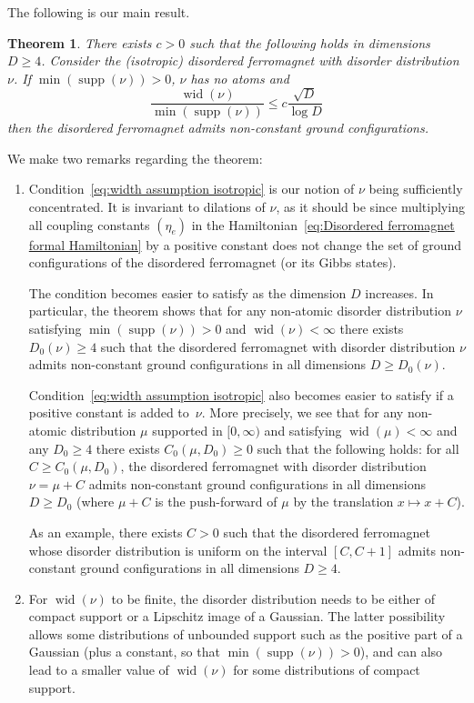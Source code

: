 \documentclass[11pt, reqno]{amsart}
\newtheorem{theorem}{Theorem}[section]
\DeclareMathOperator{\supp}{supp}
\DeclareMathOperator{\wid}{wid}
\numberwithin{equation}{section}
\begin{document}
The following is our main result.
\begin{theorem}\label{thm:non-constant ground configuration}
There exists $c>0$ such that the following holds in dimensions $D\ge 4$. Consider the (isotropic) disordered ferromagnet with disorder distribution $\nu$. If $\min(\supp(\nu))>0$, $\nu$ has no atoms
and
\begin{equation}
\label{eq:width assumption isotropic}
\frac{\wid(\nu)}{\min(\supp(\nu))}\le c\frac{\sqrt{D}}{\log D}
\end{equation}
then the disordered ferromagnet admits non-constant ground configurations.
\end{theorem}
We make two remarks regarding the theorem:
\begin{enumerate}
\item 
Condition~\eqref{eq:width assumption isotropic} is our notion of $\nu$ being sufficiently concentrated. It is invariant to dilations of $\nu$, as it should be since multiplying all coupling constants $(\eta_e)$ in the Hamiltonian~\eqref{eq:Disordered ferromagnet formal Hamiltonian} by a positive constant does not change the set of ground configurations of the disordered ferromagnet (or its Gibbs states).

The condition becomes easier to satisfy as the dimension $D$ increases. In particular, the theorem shows that for any non-atomic disorder distribution $\nu$ satisfying $\min(\supp(\nu))>0$ and $\wid(\nu)<\infty$ there exists $D_0(\nu)\ge 4$ such that the disordered ferromagnet with disorder distribution $\nu$ admits non-constant ground configurations in all dimensions $D\ge D_0(\nu)$.

Condition~\eqref{eq:width assumption isotropic} also becomes easier to satisfy if a positive constant is added to~$\nu$. More precisely, we see that for any non-atomic distribution $\mu$ supported in $[0,\infty)$ and satisfying $\wid(\mu)<\infty$ and any $D_0\ge 4$  there exists $C_0(\mu,D_0)\ge 0$ such that the following holds: for all $C\ge C_0(\mu,D_0)$, the disordered ferromagnet with disorder distribution $\nu = \mu + C$ admits non-constant ground configurations in all dimensions $D\ge D_0$ (where $\mu+C$ is the push-forward of $\mu$ by the translation $x\mapsto x+C$).
    
As an example, there exists $C>0$ such that the disordered ferromagnet whose disorder distribution is  uniform on the interval $[C,C+1]$ admits non-constant ground configurations in all dimensions $D\ge 4$.
    
\item For $\wid(\nu)$ to be finite, the disorder distribution needs to be either of compact support or a Lipschitz image of a Gaussian. The latter possibility allows some distributions of unbounded support such as the positive part of a Gaussian (plus a constant, so that $\min(\supp(\nu))>0$), and can also lead to a smaller value of $\wid(\nu)$ for some distributions of compact support.
\end{enumerate}
\end{document}
